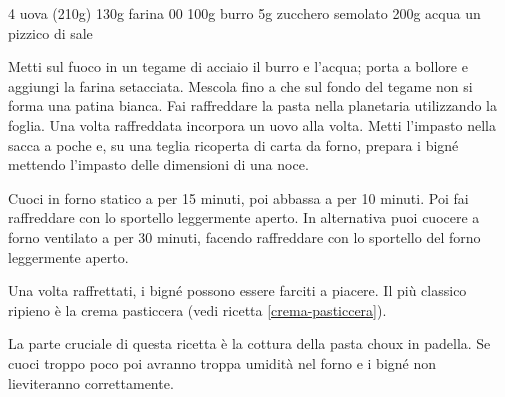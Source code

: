 \begin{ingreds}
	4 uova (210g)
	130g farina 00
	100g burro
	5g zucchero semolato
	200g acqua
	un pizzico di sale


\end{ingreds}

\begin{method}
Metti sul fuoco in un tegame di acciaio il burro e l'acqua; porta a bollore e aggiungi la farina setacciata. Mescola fino a che sul fondo del tegame non si forma una patina bianca.
Fai raffreddare la pasta nella planetaria utilizzando la foglia. Una volta raffreddata incorpora un uovo alla volta.
Metti l'impasto nella sacca a poche e, su una teglia ricoperta di carta da forno, prepara i bigné mettendo l'impasto delle dimensioni di una noce.

	Cuoci in forno statico a  per 15 minuti, poi abbassa a  per 10 minuti. Poi fai raffreddare con lo sportello leggermente aperto.
In alternativa puoi cuocere a forno ventilato a  per 30 minuti, facendo raffreddare con lo sportello del forno leggermente aperto.

	Una volta raffrettati, i bigné possono essere farciti a piacere. Il più classico ripieno è la crema pasticcera (vedi ricetta \ref{crema-pasticcera}).
\end{method}

\begin{note}
	La parte cruciale di questa ricetta è la cottura della pasta choux in padella. Se cuoci troppo poco poi avranno troppa umidità nel forno e i bigné non lieviteranno correttamente.
\end{note}



